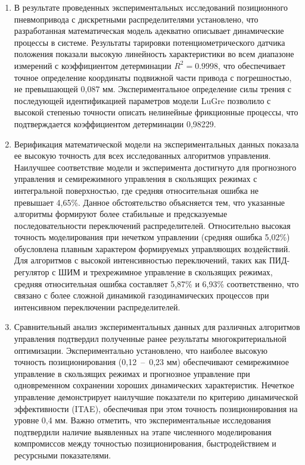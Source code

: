 \begin{enumerate}
    \item В результате проведенных экспериментальных исследований позиционного пневмопривода с
дискретными распределителями установлено, что разработанная математическая модель адекватно описывает
динамические процессы в системе. Результаты тарировки потенциометрического датчика положения показали
высокую линейность характеристики во всем диапазоне измерений с коэффициентом детерминации $R^2 = \num{0,9998}$,
что обеспечивает точное определение координаты подвижной части привода с погрешностью, не превышающей 0,087 мм.
Экспериментальное определение силы трения с последующей идентификацией параметров модели LuGre позволило с высокой степенью
точности описать нелинейные фрикционные процессы, что подтверждается коэффициентом детерминации 0,98229.

\item Верификация математической модели на экспериментальных данных показала ее высокую точность для всех
исследованных алгоритмов управления. Наилучшее соответствие модели и эксперимента достигнуто для прогнозного
управления и семирежимного управления в скользящих режимах с интегральной поверхностью, где средняя относительная
ошибка не превышает 4,65\%. Данное обстоятельство объясняется тем, что указанные алгоритмы формируют более стабильные
и предсказуемые последовательности переключений распределителей. Относительно высокая точность моделирования при
нечетком управлении (средняя ошибка 5,02\%) обусловлена плавным характером формируемых управляющих воздействий. Для алгоритмов
с высокой интенсивностью переключений, таких как ПИД-регулятор с ШИМ и трехрежимное управление в скользящих режимах, средняя
относительная ошибка составляет 5,87\% и 6,93\% соответственно, что связано с более сложной динамикой газодинамических
процессов при интенсивном переключении распределителей.

\item Сравнительный анализ экспериментальных данных для различных алгоритмов управления подтвердил полученные ранее результаты
многокритериальной оптимизации. Экспериментально установлено, что наиболее высокую точность позиционирования (0,12~--~0,23 мм) обеспечивают
семирежимное управление в скользящих режимах и прогнозное управление при одновременном сохранении хороших динамических характеристик.
Нечеткое управление демонстрирует наилучшие показатели по критерию динамической эффективности (ITAE), обеспечивая при этом точность
позиционирования на уровне 0,4 мм. Важно отметить, что экспериментальные исследования подтвердили наличие выявленных на этапе численного
моделирования компромиссов между точностью позиционирования, быстродействием и ресурсными показателями.


\end{enumerate}
